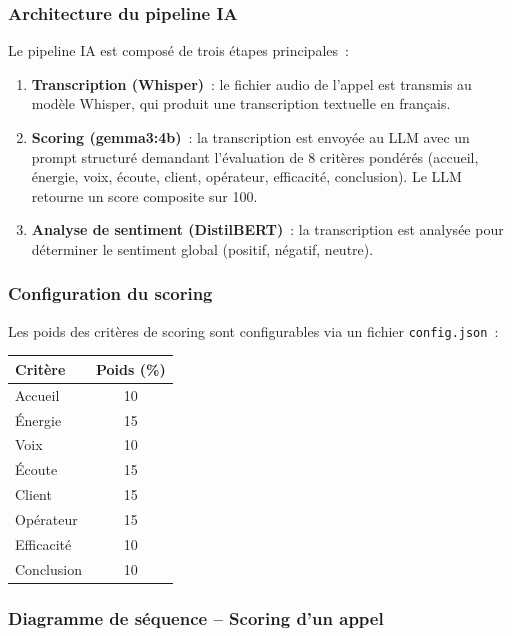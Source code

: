 \subsubsection{Architecture du pipeline IA}

Le pipeline IA est composé de trois étapes principales~:

\begin{enumerate}
    \item \textbf{Transcription (Whisper)}~: le fichier audio de l'appel est transmis au
    modèle Whisper, qui produit une transcription textuelle en français.
    \item \textbf{Scoring (gemma3:4b)}~: la transcription est envoyée au LLM avec un prompt
    structuré demandant l'évaluation de 8 critères pondérés (accueil, énergie, voix, écoute,
    client, opérateur, efficacité, conclusion). Le LLM retourne un score composite sur 100.
    \item \textbf{Analyse de sentiment (DistilBERT)}~: la transcription est analysée pour
    déterminer le sentiment global (positif, négatif, neutre).
\end{enumerate}

\subsubsection{Configuration du scoring}

Les poids des critères de scoring sont configurables via un fichier \texttt{config.json}~:

\begin{center}
\begin{tabular}{|l|c|}
\hline
\textbf{Critère} & \textbf{Poids (\%)} \\
\hline
Accueil & 10 \\
\hline
Énergie & 15 \\
\hline
Voix & 10 \\
\hline
Écoute & 15 \\
\hline
Client & 15 \\
\hline
Opérateur & 15 \\
\hline
Efficacité & 10 \\
\hline
Conclusion & 10 \\
\hline
\end{tabular}
\end{center}

\subsubsection{Diagramme de séquence -- Scoring d'un appel}

